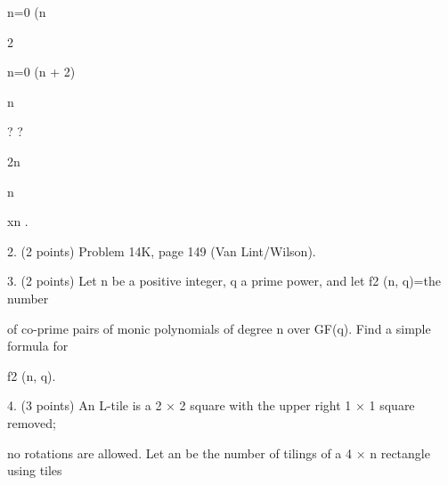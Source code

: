 \documentclass[a4paper,portrait,12pt]{article}
\begin{document}
\begin{flushleft}
n=0 (n
\end{flushleft}





2


\begin{flushleft}
n=0 (n + 2)
\end{flushleft}





\begin{flushleft}
n
\end{flushleft}





? ?


\begin{flushleft}
2n
\end{flushleft}


\begin{flushleft}
n
\end{flushleft}





\begin{flushleft}
xn .
\end{flushleft}





\begin{flushleft}
2. (2 points) Problem 14K, page 149 (Van Lint/Wilson).
\end{flushleft}


\begin{flushleft}
3. (2 points) Let n be a positive integer, q a prime power, and let f2 (n, q)=the number
\end{flushleft}


\begin{flushleft}
of co-prime pairs of monic polynomials of degree n over GF(q). Find a simple formula for
\end{flushleft}


\begin{flushleft}
f2 (n, q).
\end{flushleft}


\begin{flushleft}
4. (3 points) An L-tile is a 2 × 2 square with the upper right 1 × 1 square removed;
\end{flushleft}


\begin{flushleft}
no rotations are allowed. Let an be the number of tilings of a 4 × n rectangle using tiles
\end{flushleft}
\end{document}
